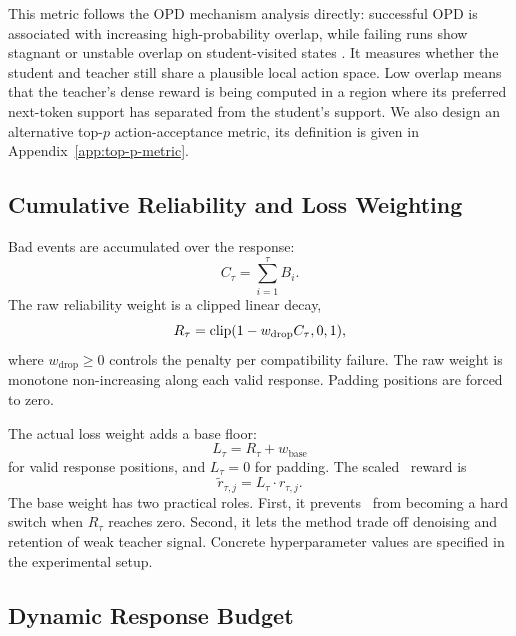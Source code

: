 This metric follows the OPD mechanism analysis directly: successful OPD is associated with increasing high-probability overlap, while failing runs show stagnant or unstable overlap on student-visited states \citep{li2026rethinking}.
It measures whether the student and teacher still share a plausible local action space.
Low overlap means that the teacher's dense reward is being computed in a region where its preferred next-token support has separated from the student's support.
We also design an alternative top-$p$ action-acceptance metric, its definition is given in Appendix~\ref{app:top-p-metric}.

\subsection{Cumulative Reliability and Loss Weighting}

Bad events are accumulated over the response:
\begin{equation}
    C_{\tau} = \sum_{i=1}^{\tau} B_i.
\end{equation}
The raw reliability weight is a clipped linear decay,
\begin{equation}
    R_{\tau} = \mathrm{clip}(1 - w_{\mathrm{drop}} C_{\tau}, 0, 1),
    \label{eq:raw-weight}
\end{equation}
where $w_{\mathrm{drop}}\geq 0$ controls the penalty per compatibility failure.
The raw weight is monotone non-increasing along each valid response.
Padding positions are forced to zero.

The actual loss weight adds a base floor:
\begin{equation}
    L_{\tau} = R_{\tau} + w_{\mathrm{base}}
    \label{eq:loss-weight}
\end{equation}
for valid response positions, and $L_{\tau}=0$ for padding.
The scaled \opd~reward is
\begin{equation}
    \widetilde{r}_{\tau,j} = L_{\tau} \cdot r_{\tau,j}.
    \label{eq:scaled-reward}
\end{equation}
The base weight has two practical roles.
First, it prevents \method~from becoming a hard switch when $R_{\tau}$ reaches zero.
Second, it lets the method trade off denoising and retention of weak teacher signal.
Concrete hyperparameter values are specified in the experimental setup.

\subsection{Dynamic Response Budget}

